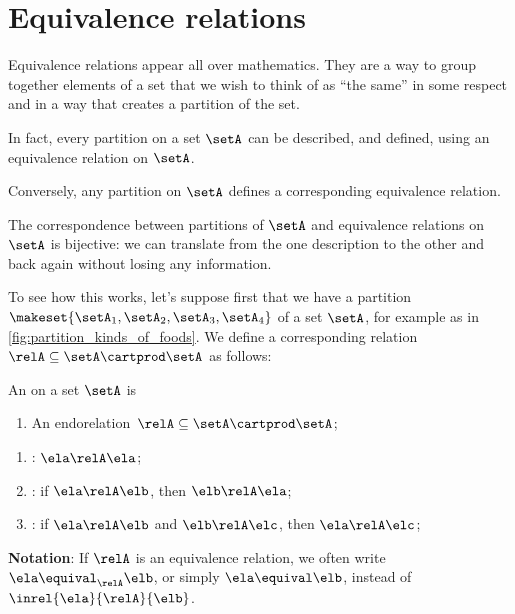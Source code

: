 
\section{Equivalence relations}



Equivalence relations appear all over mathematics. They are a way to group together elements of a set that we wish to think of as ``the same'' in some respect and in a way that creates a partition of the set. 

In fact, every partition on a set $\setA$ can be described, and defined, using an equivalence relation on $\setA$. 

Conversely, any partition on $\setA$ defines a corresponding equivalence relation. 

The correspondence between partitions of $\setA$ and equivalence relations on $\setA$ is bijective: we can translate from the one description to the other and back again without losing any information. 

To see how this works, let's suppose first that we have a partition $\makeset{\setA_1, \setA_2, \setA_3, \setA_4}$ of a set $\setA$, for example as in \cref{fig:partition_kinds_of_foods}. We define a corresponding relation $\relA \subseteq \setA \cartprod \setA$ as follows:










\begin{ctdefinition}
    \label{def:equivalence-relation}
    An  on a set $\setA$ is
    
    \constit
    \begin{enumerate}
    \item An endorelation~$\relA\subseteq \setA \cartprod \setA$;
    \end{enumerate}
    \condit
    \begin{enumerate}
    \item  {}: $\ela \relA \ela$;
    \item {}: if $\ela \relA \elb$, then $\elb \relA \ela$;
    \item {}: if $\ela \relA \elb$ and $\elb \relA \elc$, then $\ela \relA \elc$;
     \end{enumerate}

    \textbf{Notation}: If $\relA$ is an equivalence relation, we often write~$\ela\equival_\relA \elb$, or simply $\ela\equival \elb$, instead of~$\inrel{\ela}{\relA}{\elb}$.
\end{ctdefinition}

